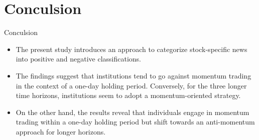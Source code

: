 \documentclass{beamer}
\begin{document}
\section{Conculsion}


\begin{frame}{Conculsion}
    \begin{itemize}
        \item The present study introduces an approach to categorize stock-specific news into positive and negative classifications.
        \item The findings suggest that institutions tend to go against momentum trading in the context of a one-day holding period. Conversely, for the three longer time horizons, institutions seem to adopt a momentum-oriented strategy.
        \item On the other hand, the results reveal that individuals engage in momentum trading within a one-day holding period but shift towards an anti-momentum approach for longer horizons.
    \end{itemize}
\end{frame}
\end{document}
